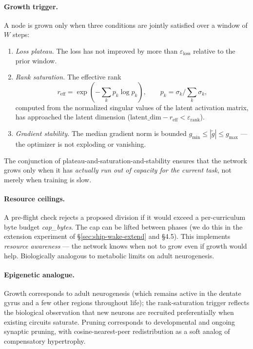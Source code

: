\documentclass[11pt]{article}
\newcommand{\reff}{r_{\text{eff}}}
\begin{document}
\paragraph{Growth trigger.}
A node is grown only when three conditions are jointly satisfied over a
window of $W$ steps:
\begin{enumerate}[leftmargin=2em]
  \item \emph{Loss plateau.} The loss has not improved by more than
        $\varepsilon_{\text{loss}}$ relative to the prior window.
  \item \emph{Rank saturation.} The effective rank
        \begin{equation*}
          \reff = \exp\!\left(-\sum_k p_k \log p_k\right),
          \qquad p_k = \sigma_k \big/ \textstyle\sum_k \sigma_k,
        \end{equation*}
        computed from the normalized singular values of the latent
        activation matrix, has approached the latent dimension
        ($\text{latent\_dim} - \reff < \varepsilon_{\text{rank}}$).
  \item \emph{Gradient stability.} The median gradient norm is bounded
        $g_{\min} \leq |\tilde g| \leq g_{\max}$ --- the optimizer is not
        exploding or vanishing.
\end{enumerate}
The conjunction of plateau-and-saturation-and-stability ensures that the
network grows only when it has \emph{actually run out of capacity for the
current task}, not merely when training is slow.

\paragraph{Resource ceilings.}
A pre-flight check rejects a proposed division if it would exceed a
per-curriculum byte budget \textit{cap\_bytes}. The cap can be lifted
between phases (we do this in the extension experiment of
\S\ref{sec:ship-wake-extend} and \S4.5). This implements \emph{resource
awareness} --- the network knows when not to grow even if growth would
help. Biologically analogous to metabolic limits on adult neurogenesis.

\paragraph{Epigenetic analogue.}
Growth corresponds to adult neurogenesis (which remains active in the
dentate gyrus and a few other regions throughout life); the
rank-saturation trigger reflects the biological observation that new
neurons are recruited preferentially when existing circuits saturate.
Pruning corresponds to developmental and ongoing synaptic pruning, with
cosine-nearest-peer redistribution as a soft analog of compensatory
hypertrophy.
\end{document}

